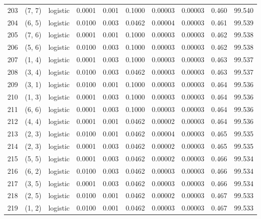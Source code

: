 \begin{tabular}{lllrrrrrrr}
203 &      (7, 7) &  logistic &  0.0001 &  0.001 &  0.1000 &          0.00003 &    0.00003 &       0.460 &    99.540 \\
204 &      (6, 5) &  logistic &  0.0100 &  0.003 &  0.0462 &          0.00004 &    0.00003 &       0.461 &    99.539 \\
205 &      (7, 6) &  logistic &  0.0001 &  0.001 &  0.1000 &          0.00003 &    0.00003 &       0.462 &    99.538 \\
206 &      (5, 6) &  logistic &  0.0100 &  0.003 &  0.1000 &          0.00003 &    0.00003 &       0.462 &    99.538 \\
207 &      (1, 4) &  logistic &  0.0001 &  0.003 &  0.1000 &          0.00003 &    0.00003 &       0.463 &    99.537 \\
208 &      (3, 4) &  logistic &  0.0100 &  0.003 &  0.0462 &          0.00003 &    0.00003 &       0.463 &    99.537 \\
209 &      (3, 1) &  logistic &  0.0100 &  0.001 &  0.1000 &          0.00003 &    0.00003 &       0.464 &    99.536 \\
210 &      (1, 3) &  logistic &  0.0001 &  0.003 &  0.1000 &          0.00003 &    0.00003 &       0.464 &    99.536 \\
211 &      (6, 6) &  logistic &  0.0001 &  0.003 &  0.1000 &          0.00003 &    0.00003 &       0.464 &    99.536 \\
212 &      (4, 4) &  logistic &  0.0001 &  0.001 &  0.0462 &          0.00002 &    0.00003 &       0.464 &    99.536 \\
213 &      (2, 3) &  logistic &  0.0100 &  0.001 &  0.0462 &          0.00004 &    0.00003 &       0.465 &    99.535 \\
214 &      (2, 3) &  logistic &  0.0001 &  0.003 &  0.0462 &          0.00002 &    0.00003 &       0.465 &    99.535 \\
215 &      (5, 5) &  logistic &  0.0001 &  0.003 &  0.0462 &          0.00002 &    0.00003 &       0.466 &    99.534 \\
216 &      (6, 2) &  logistic &  0.0100 &  0.003 &  0.0462 &          0.00003 &    0.00003 &       0.466 &    99.534 \\
217 &      (3, 5) &  logistic &  0.0001 &  0.003 &  0.0462 &          0.00003 &    0.00003 &       0.466 &    99.534 \\
218 &      (2, 5) &  logistic &  0.0100 &  0.001 &  0.0462 &          0.00002 &    0.00003 &       0.467 &    99.533 \\
219 &      (1, 2) &  logistic &  0.0100 &  0.001 &  0.0462 &          0.00003 &    0.00003 &       0.467 &    99.533 \\

\end{tabular}
